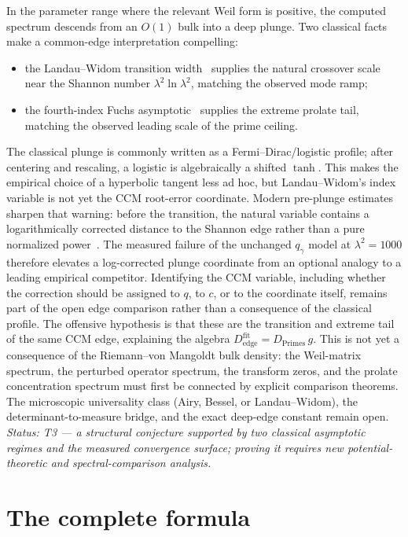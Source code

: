 \documentclass[11pt,a4paper]{article}
\begin{document}
In the parameter range where the relevant Weil form is positive, the computed
spectrum descends from an $O(1)$ bulk into a deep plunge. Two classical facts
make a common-edge interpretation compelling:
\begin{itemize}
\item the Landau--Widom transition width~\cite{LandauWidom1980} supplies the
  natural crossover scale near the Shannon number
  $\lambda^2\ln\lambda^2$, matching the observed mode ramp;
\item the fourth-index Fuchs asymptotic~\cite{Fuchs1964} supplies the extreme
  prolate tail, matching the observed leading scale of the prime ceiling.
\end{itemize}
The classical plunge is commonly written as a Fermi--Dirac/logistic
profile; after centering and rescaling, a logistic is algebraically a shifted
$\tanh$. This makes the empirical choice of a hyperbolic tangent less ad hoc,
but Landau--Widom's index variable is not yet the CCM root-error coordinate.
Modern pre-plunge estimates sharpen that warning: before the transition, the
natural variable contains a logarithmically corrected distance to the Shannon
edge rather than a pure normalized power~\cite{KulikovSharp2026,Azimifard2026}.
The measured failure of the unchanged $q_\gamma$ model at
$\lambda^2=1000$ therefore elevates a log-corrected plunge coordinate from an
optional analogy to a leading empirical competitor. Identifying the CCM
variable, including whether the correction should be assigned to $q$, to $c$,
or to the coordinate itself, remains part of the open edge comparison rather
than a consequence of the classical profile.
The offensive hypothesis is that these are the transition and extreme tail of
the same CCM edge, explaining the algebra
$D_{\mathrm{edge}}^{\mathrm{fit}}=D_{\mathrm{Primes}}\,g$. This is not yet a consequence of
the Riemann--von Mangoldt bulk density: the Weil-matrix spectrum, the perturbed
operator spectrum, the transform zeros, and the prolate concentration spectrum
must first be connected by explicit comparison theorems. The microscopic
universality class (Airy, Bessel, or Landau--Widom), the determinant-to-measure
bridge, and the exact deep-edge constant remain open. \emph{Status: T3 --- a
structural conjecture supported by two classical asymptotic regimes and the
measured convergence surface; proving it requires new potential-theoretic and
spectral-comparison analysis.}

\section{The complete formula}\label{sec:complete}
\end{document}
